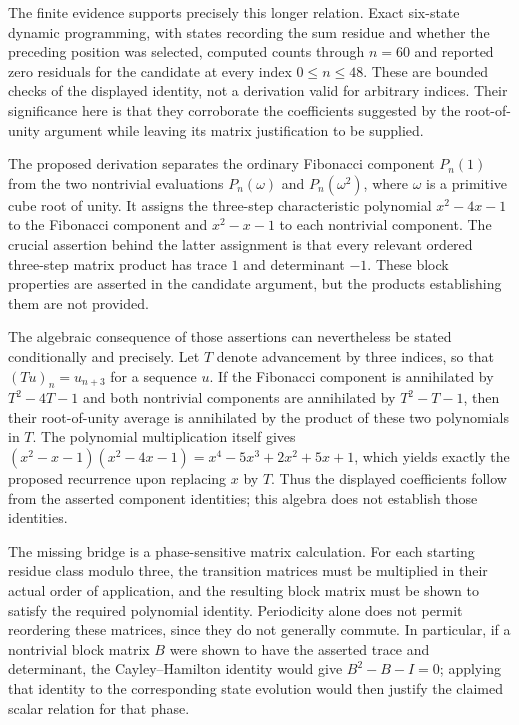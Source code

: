 \documentclass[11pt]{article}
\begin{document}
The finite evidence supports precisely this longer relation. Exact six-state dynamic programming, with states recording the sum residue and whether the preceding position was selected, computed counts through $n=60$ and reported zero residuals for the candidate at every index $0\leq n\leq48$. These are bounded checks of the displayed identity, not a derivation valid for arbitrary indices. Their significance here is that they corroborate the coefficients suggested by the root-of-unity argument while leaving its matrix justification to be supplied.

The proposed derivation separates the ordinary Fibonacci component $P_n(1)$ from the two nontrivial evaluations $P_n(\omega)$ and $P_n(\omega^2)$, where $\omega$ is a primitive cube root of unity. It assigns the three-step characteristic polynomial $x^2-4x-1$ to the Fibonacci component and $x^2-x-1$ to each nontrivial component. The crucial assertion behind the latter assignment is that every relevant ordered three-step matrix product has trace $1$ and determinant $-1$. These block properties are asserted in the candidate argument, but the products establishing them are not provided.

The algebraic consequence of those assertions can nevertheless be stated conditionally and precisely. Let $T$ denote advancement by three indices, so that $(Tu)_n=u_{n+3}$ for a sequence $u$. If the Fibonacci component is annihilated by $T^2-4T-1$ and both nontrivial components are annihilated by $T^2-T-1$, then their root-of-unity average is annihilated by the product of these two polynomials in $T$. The polynomial multiplication itself gives $(x^2-x-1)(x^2-4x-1)=x^4-5x^3+2x^2+5x+1$, which yields exactly the proposed recurrence upon replacing $x$ by $T$. Thus the displayed coefficients follow from the asserted component identities; this algebra does not establish those identities.

The missing bridge is a phase-sensitive matrix calculation. For each starting residue class modulo three, the transition matrices must be multiplied in their actual order of application, and the resulting block matrix must be shown to satisfy the required polynomial identity. Periodicity alone does not permit reordering these matrices, since they do not generally commute. In particular, if a nontrivial block matrix $B$ were shown to have the asserted trace and determinant, the Cayley–Hamilton identity would give $B^2-B-I=0$; applying that identity to the corresponding state evolution would then justify the claimed scalar relation for that phase.
\end{document}
